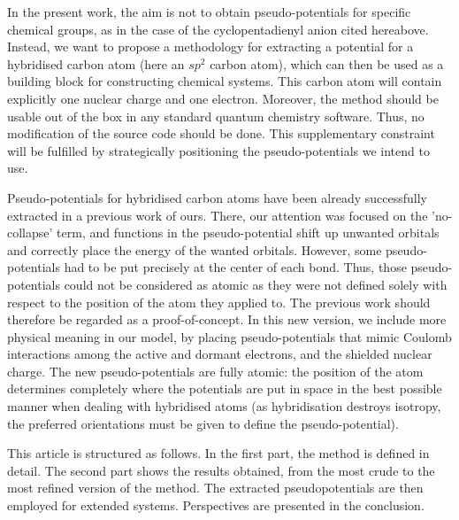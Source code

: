 \documentclass[journal=jctcce,manuscript=article]{achemso}
\begin{document}

In the present work, the aim is not to obtain pseudo-potentials for  specific
chemical groups, as in the case of the cyclopentadienyl anion cited hereabove.
Instead, we want to propose a methodology for extracting a potential for
a hybridised carbon atom (here an $sp^2$ carbon atom), which can then be
used as a building block for constructing chemical systems. This carbon atom
will contain explicitly one nuclear charge and one electron.
Moreover, the method should be usable 
out of the box in any standard quantum chemistry software.
Thus, no modification of the source code should be done.
This supplementary constraint will be fulfilled by strategically positioning the pseudo-potentials
we intend to use. 

Pseudo-potentials for hybridised carbon
atoms have been already successfully extracted in a previous work of ours.\cite{drujon_pseudopotentials_2013}
There, our attention was focused on the 'no-collapse' term, and 
functions in the pseudo-potential shift up unwanted orbitals and correctly place the energy of the
wanted orbitals.
However, some pseudo-potentials had to be put precisely at the center
of each bond.
Thus, those pseudo-potentials could not be considered as atomic as they were not defined solely
with respect to the position of the atom they applied to. The previous work should therefore be regarded as a proof-of-concept.
In this new version, we include more physical meaning in our model, 
by placing pseudo-potentials that mimic Coulomb interactions among the active and dormant electrons, and the shielded nuclear charge. 
The new pseudo-potentials are fully atomic: the position of the atom
determines completely where the potentials are put in space in the best possible manner
when dealing with hybridised atoms (as hybridisation destroys isotropy, the preferred orientations
must be given to define the pseudo-potential).

This article is structured as follows.
In the first part, the method is defined in detail.
The second part shows the results obtained, from the most crude to the most refined
version of the method.
The extracted pseudopotentials are then employed for extended systems.
Perspectives are presented in the conclusion.
\end{document}
